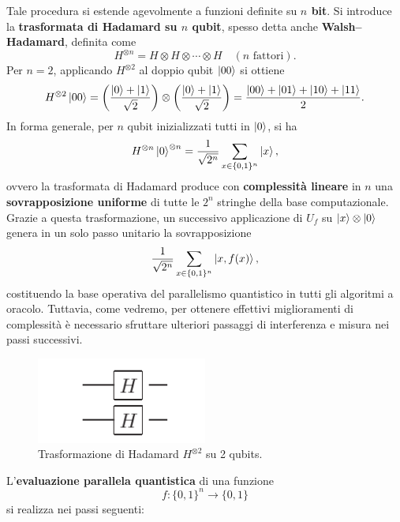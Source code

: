 \documentclass[a4paper,12pt]{report}
\theoremstyle{plain}
\begin{document}
Tale procedura si estende agevolmente a funzioni definite su \textbf{$n$ bit}. Si introduce la \textbf{trasformata di Hadamard su $n$ qubit}, spesso detta anche \textbf{Walsh--Hadamard}, definita come
\[
H^{\otimes n} = H \otimes H \otimes \cdots \otimes H
\quad(\text{$n$ fattori}).
\]
Per $n=2$, applicando $H^{\otimes2}$ al doppio qubit $\ket{00}$ si ottiene
\begin{equation}
H^{\otimes2}\ket{00}
= 
\biggl(\frac{\ket{0} + \ket{1}}{\sqrt{2}}\biggr)
\otimes
\biggl(\frac{\ket{0} + \ket{1}}{\sqrt{2}}\biggr)
= 
\frac{\ket{00} + \ket{01} + \ket{10} + \ket{11}}{2}.
\end{equation}
In forma generale, per $n$ qubit inizializzati tutti in $\ket{0}$, si ha
\begin{equation}
H^{\otimes n}\ket{0}^{\otimes n}
= 
\frac{1}{\sqrt{2^n}}\sum_{x\in\{0,1\}^n}\ket{x},
\end{equation}
ovvero la trasformata di Hadamard produce con \textbf{complessità lineare} in $n$ una \textbf{sovrapposizione uniforme} di tutte le $2^n$ stringhe della base computazionale.
Grazie a questa trasformazione, un successivo applicazione di $U_f$ su $\ket{x}\otimes\ket{0}$ genera in un solo passo unitario la sovrapposizione
\[
\frac{1}{\sqrt{2^n}}
\sum_{x\in\{0,1\}^n}\ket{x,f(x)},
\]
costituendo la base operativa del parallelismo quantistico in tutti gli algoritmi a oracolo. Tuttavia, come vedremo, per ottenere effettivi miglioramenti di complessità è necessario sfruttare ulteriori passaggi di interferenza e misura nei passi successivi.
\begin{figure}[H]
    \centering
    \includegraphics[width=0.5\textwidth]{Immagine17.png} 
    \caption{Trasformazione di Hadamard $H^{\otimes 2}$ su 2 qubits.}
    \label{Immagine17}
\end{figure}
\noindent L'\textbf{evaluazione parallela quantistica} di una funzione
\[
f\colon\{0,1\}^n \to \{0,1\}
\]
si realizza nei passi seguenti:
\end{document}
